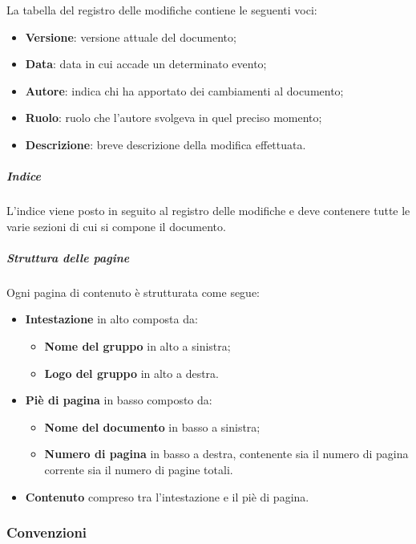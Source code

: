 La tabella del registro delle modifiche contiene le seguenti voci:
\begin{itemize}
    \item \textbf{Versione}: versione attuale del documento;
    \item \textbf{Data}: data in cui accade un determinato evento;
    \item \textbf{Autore}: indica chi ha apportato dei cambiamenti al documento;
    \item \textbf{Ruolo}: ruolo che l'autore svolgeva in quel preciso momento;
    \item \textbf{Descrizione}: breve descrizione della modifica effettuata.
\end {itemize}
\subparagraph{Indice}
L'indice viene posto in seguito al registro delle modifiche e deve contenere tutte le varie sezioni di cui si compone il documento.
\subparagraph{Struttura delle pagine}
Ogni pagina di contenuto è strutturata come segue:
\begin {itemize}
    \item \textbf{Intestazione} in alto composta da:
    \begin {itemize}
        \item \textbf{Nome del gruppo} in alto a sinistra;
        \item \textbf{Logo del gruppo} in alto a destra.
    \end{itemize}
    \item \textbf{Piè di pagina} in basso composto da:
    \begin{itemize}
        \item \textbf{Nome del documento} in basso a sinistra;
        \item \textbf{Numero di pagina} in basso a destra, contenente sia il numero di pagina corrente sia il numero di pagine totali.
    \end {itemize}
    \item \textbf{Contenuto} compreso tra l'intestazione e il piè di pagina.
\end {itemize}

\subsubsection{Convenzioni}
